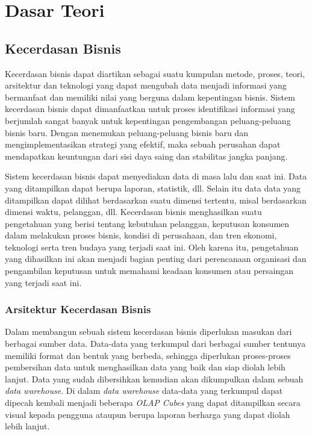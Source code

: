 \chapter{Dasar Teori}
\label{chap:dasar_teori}
	
\section{Kecerdasan Bisnis}
\label{sec:kecerdasan_bisnis}
Kecerdasan bisnis dapat diartikan sebagai suatu kumpulan metode, proses, teori, arsitektur dan teknologi yang dapat mengubah data menjadi informasi yang bermanfaat dan memiliki nilai yang berguna dalam kepentingan bisnis. Sistem kecerdasan bisnis dapat dimanfaatkan untuk proses identifikasi informasi yang berjumlah sangat banyak untuk kepentingan pengembangan peluang-peluang bisnis baru. Dengan menemukan peluang-peluang bisnis baru dan mengimplementasikan strategi yang efektif, maka sebuah perusahan dapat mendapatkan keuntungan dari sisi daya saing dan stabilitas jangka panjang.

Sistem kecerdasan bisnis dapat menyediakan data di masa lalu dan saat ini. Data yang ditampilkan dapat berupa laporan, statistik, dll. Selain itu data data yang ditampilkan dapat dilihat berdasarkan suatu dimensi tertentu, misal berdasarkan dimensi waktu, pelanggan, dll. Kecerdasan bisnis menghasilkan suatu pengetahuan yang berisi tentang kebutuhan pelanggan, keputusan konsumen dalam melakukan proses bisnis, kondisi di perusahaan, dan tren ekonomi, teknologi serta tren budaya yang terjadi saat ini. Oleh karena itu, pengetahuan yang dihasilkan ini akan menjadi bagian penting dari perencanaan organisasi dan pengambilan keputusan untuk memahami keadaan konsumen atau persaingan yang terjadi saat ini.

\subsection{Arsitektur Kecerdasan Bisnis}
\label{sec:arsitektur_kecerdasan_bisnis}

Dalam membangun sebuah sistem kecerdasan bisnis diperlukan masukan dari berbagai sumber data. Data-data yang terkumpul dari berbagai sumber tentunya memiliki format dan bentuk yang berbeda, sehingga diperlukan proses-proses pembersihan data untuk menghasilkan data yang baik dan siap diolah lebih lanjut. Data yang sudah dibersihkan kemudian akan dikumpulkan dalam sebuah \textit{data warehouse}. Di dalam \textit{data warehouse} data-data yang terkumpul dapat dipecah kembali menjadi beberapa \textit{OLAP Cubes} yang dapat ditampilkan secara visual kepada pengguna ataupun berupa laporan berharga yang dapat diolah lebih lanjut.

